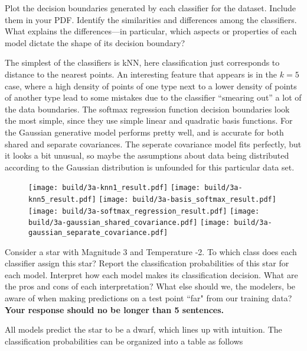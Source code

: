 \documentclass[expanded]{lkx_pset}
\begin{document}
\begin{parts}
	\begin{part}{1}
		Plot the decision boundaries generated by each classifier for the dataset. Include them in your PDF. Identify the similarities and differences among the classifiers. What explains the differences---in particular, which aspects or properties of each model dictate the shape of its decision boundary?
	\end{part}

	The simplest of the classifiers is kNN, here classification just corresponds to distance to the nearest points. An interesting feature that appears is in the $k=5$ case, where a high density of points of one type next to a lower density of points of another type lead to some mistakes due to the classifier ``smearing out'' a lot of the data boundaries. The softmax regression function decision boundaries look the most simple, since they use simple linear and quadratic basis functions. For the Gaussian generative model performs pretty well, and is accurate for both shared and separate covariances. The seperate covariance model fits perfectly, but it looks a bit unusual, so maybe the assumptions about data being distributed according to the Gaussian distribution is unfounded for this particular data set.

	\begin{figure}[ht]
		\centering
		\texttt{[image: build/3a-knn1\_result.pdf]}
		\texttt{[image: build/3a-knn5\_result.pdf]}
		\texttt{[image: build/3a-basis\_softmax\_result.pdf]}
		\texttt{[image: build/3a-softmax\_regression\_result.pdf]}
		\texttt{[image: build/3a-gaussian\_shared\_covariance.pdf]}
		\texttt{[image: build/3a-gaussian\_separate\_covariance.pdf]}
	\end{figure}\noindent

	\pagebreak
	\begin{part}{2}
		Consider a star with Magnitude 3 and Temperature -2. To which class does each classifier assign this star? Report the classification probabilities of this star for each model. Interpret how each model makes its classification decision. What are the pros and cons of each interpretation? What else should we, the modelers, be aware of when making predictions on a test point ``far" from our training data? \textbf{Your response should no be longer than 5 sentences.}
	\end{part}

	All models predict the star to be a dwarf, which lines up with intuition. The classification probabilities can be organized into a table as follows


\end{parts}
\end{document}
